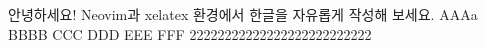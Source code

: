 \documentclass{article}
\begin{document}
안녕하세요! Neovim과 xelatex 환경에서 한글을 자유롭게 작성해 보세요.
AAAa
BBBB
CCC
DDD
EEE
FFF
22222222222222222222222222
\end{document}
